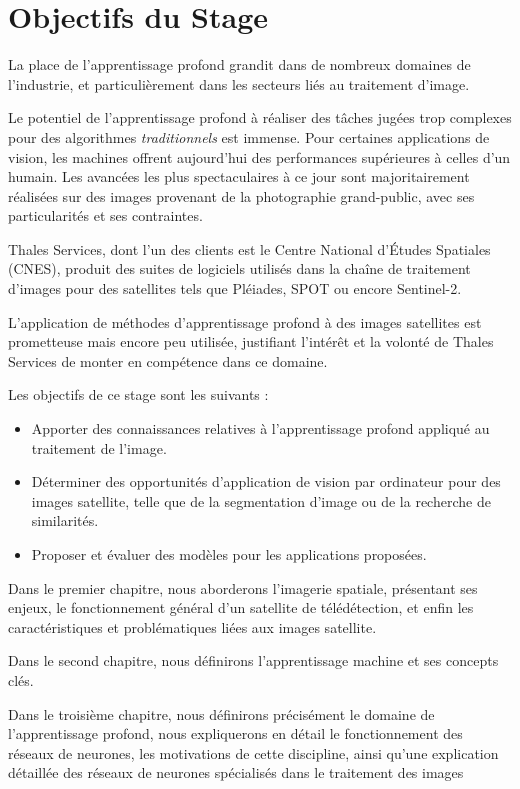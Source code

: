 \documentclass[a4paper, 11pt]{report}
\begin{document}
\section{Objectifs du Stage}
La place de l'apprentissage profond grandit dans de nombreux domaines de l'industrie, et particulièrement dans les secteurs liés au traitement d'image.

Le potentiel de l'apprentissage profond à réaliser des tâches jugées trop complexes pour des algorithmes \emph{traditionnels} est immense.
Pour certaines applications de vision, les machines offrent aujourd'hui des performances supérieures à celles d'un humain.
Les avancées les plus spectaculaires à ce jour sont majoritairement réalisées sur des images provenant de la photographie grand-public, avec ses particularités et ses contraintes.

Thales Services, dont l'un des clients est le Centre National d'Études Spatiales (CNES), produit des suites de logiciels utilisés dans la chaîne de traitement d'images pour des satellites tels que Pléiades, SPOT ou encore Sentinel-2.

L'application de méthodes d'apprentissage profond à des images satellites est prometteuse mais encore peu utilisée, justifiant l'intérêt et la volonté de Thales Services de monter en compétence dans ce domaine.

Les objectifs de ce stage sont les suivants :
\begin{itemize}
	\item Apporter des connaissances relatives à l'apprentissage profond appliqué au traitement de l'image.
	\item Déterminer des opportunités d'application de vision par ordinateur pour des images satellite, telle que de la segmentation d'image ou de la recherche de similarités.
	\item Proposer et évaluer des modèles pour les applications proposées.
\end{itemize}

Dans le premier chapitre, nous aborderons l'imagerie spatiale, présentant ses enjeux, le fonctionnement général d'un satellite de télédétection, et enfin les caractéristiques et problématiques liées aux images satellite.

Dans le second chapitre, nous définirons l'apprentissage machine et ses concepts clés.

Dans le troisième chapitre, nous définirons précisément le domaine de l'apprentissage profond, nous expliquerons en détail le fonctionnement des réseaux de neurones, les motivations de cette discipline, ainsi qu'une explication détaillée des réseaux de neurones spécialisés dans le traitement des images
\end{document}
